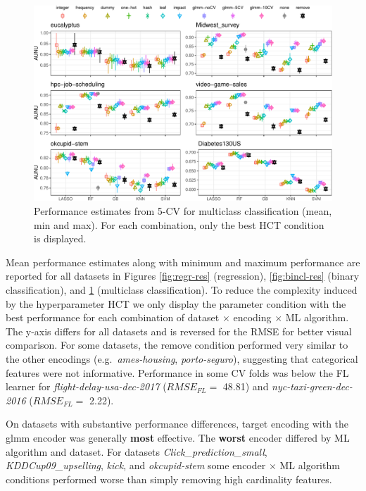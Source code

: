 \documentclass[smallextended]{svjour3}       %
\begin{document}
\begin{figure}[!h]
\includegraphics[width=\textwidth]{multcl-res-1} \caption{Performance estimates from 5-CV for multiclass classification (mean, min and max). For each combination, only the best HCT condition is displayed.}\label{fig:multcl-res}
\end{figure}

Mean performance estimates along with minimum and maximum performance are reported for all datasets in Figures \ref{fig:regr-res} (regression), \ref{fig:bincl-res} (binary classification), and \ref{fig:multcl-res} (multiclass classification).
To reduce the complexity induced by the hyperparameter HCT we only display the parameter condition with the best performance for each combination of dataset \(\times\) encoding \(\times\) ML algorithm.
The y-axis differs for all datasets and is reversed for the RMSE for better visual comparison.
For some datasets, the remove condition performed very similar to the other encodings (e.g.~\emph{ames-housing}, \emph{porto-seguro}), suggesting that categorical features were not informative.
Performance in some CV folds was below the FL learner for \emph{flight-delay-usa-dec-2017} (\(RMSE_{FL} =\) 48.81) and \emph{nyc-taxi-green-dec-2016} (\(RMSE_{FL} =\) 2.22).

On datasets with substantive performance differences, target encoding with the glmm encoder was generally \textbf{most} effective.
The \textbf{worst} encoder differed by ML algorithm and dataset.
For datasets \emph{Click\_prediction\_small}, \emph{KDDCup09\_upselling}, \emph{kick}, and \emph{okcupid-stem} some encoder \(\times\) ML algorithm conditions performed worse than simply removing high cardinality features.
\end{document}

